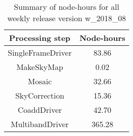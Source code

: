 \begin{table}[h]
  \centering
  \begin{tabular} {|c|c|}
    \hline
    Processing step & Node-hours \\
    \hline
    SingleFrameDriver &  83.86 \\ 
    MakeSkyMap        &   0.02 \\
    Mosaic            &  32.66 \\
    SkyCorrection     &  15.36 \\
    CoaddDriver       &  42.70 \\
    MultibandDriver   & 365.28 \\
    \hline
  \end{tabular}
  \caption{Summary of node-hours for all weekly release version w\_2018\_08}
  \label{tbl:PerTask08}
\end{table}
